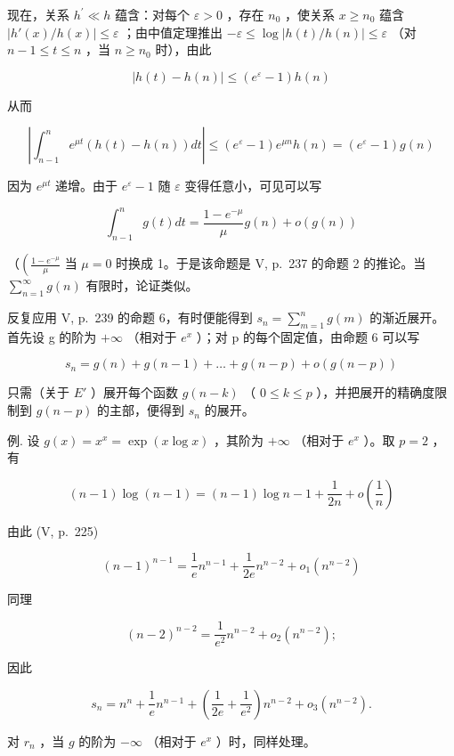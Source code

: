 现在，关系 \(h^{\prime} \ll h\) 蕴含：对每个 \(\varepsilon > 0\) ，存在 \(n_{0}\) ，使关系 \(x \geqslant n_{0}\) 蕴含 \(\left|h'(x)/h(x)\right| \leqslant \varepsilon\) ；由中值定理推出 \(-\varepsilon \leqslant \log |h(t)/h(n)| \leqslant \varepsilon\) （对 \(n - 1 \leqslant t \leqslant n\) ，当 \(n \geqslant n_{0}\) 时），由此

\[
| h (t) - h (n) | \leqslant \left(e ^ {\varepsilon} - 1\right) h (n)
\]

从而

\[
\left| \int_ {n - 1} ^ {n} e ^ {\mu t} (h (t) - h (n)) d t \right| \leqslant (e ^ {\varepsilon} - 1) e ^ {\mu n} h (n) = (e ^ {\varepsilon} - 1) g (n)
\]

因为 \(e^{\mu t}\) 递增。由于 \(e^{\varepsilon} - 1\) 随 \(\varepsilon\) 变得任意小，可见可以写

\[
\int_ {n - 1} ^ {n} g (t) d t = \frac {1 - e ^ {- \mu}}{\mu} g (n) + o (g (n))
\]

（\(\left(\frac{1 - e^{-\mu}}{\mu}\right.\) 当 \(\mu = 0\) 时换成 1。于是该命题是 V, p.~237 的命题 2 的推论。当 \(\sum_{n=1}^{\infty} g(n)\) 有限时，论证类似。

反复应用 V, p.~239 的命题 6，有时便能得到 \(s_{n} = \sum_{m=1}^{n} g(m)\) 的渐近展开。首先设 g 的阶为 \(+\infty\) （相对于 \(e^{x}\) ）；对 p 的每个固定值，由命题 6 可以写

\[
s _ {n} = g (n) + g (n - 1) + \dots + g (n - p) + o (g (n - p))
\]

只需（关于 \(E'\) ）展开每个函数 \(g(n-k)\) （ \(0 \leqslant k \leqslant p\) ），并把展开的精确度限制到 \(g(n-p)\) 的主部，便得到 \(s_{n}\) 的展开。

例. 设 \(g(x) = x^{x} = \exp (x\log x)\) ，其阶为 \(+\infty\) （相对于 \(e^x\) ）。取 \(p = 2\) ，有

\[
(n - 1) \log (n - 1) = (n - 1) \log n - 1 + \frac {1}{2 n} + o \left(\frac {1}{n}\right)
\]

由此 (V, p.~225)

\[
(n - 1) ^ {n - 1} = \frac {1}{e} n ^ {n - 1} + \frac {1}{2 e} n ^ {n - 2} + o _ {1} (n ^ {n - 2})
\]

同理

\[
(n - 2) ^ {n - 2} = \frac {1}{e ^ {2}} n ^ {n - 2} + o _ {2} (n ^ {n - 2});
\]

因此

\[
s _ {n} = n ^ {n} + \frac {1}{e} n ^ {n - 1} + \left(\frac {1}{2 e} + \frac {1}{e ^ {2}}\right) n ^ {n - 2} + o _ {3} (n ^ {n - 2}).
\]

对 \(r_n\) ，当 \(g\) 的阶为 \(-\infty\) （相对于 \(e^x\) ）时，同样处理。

